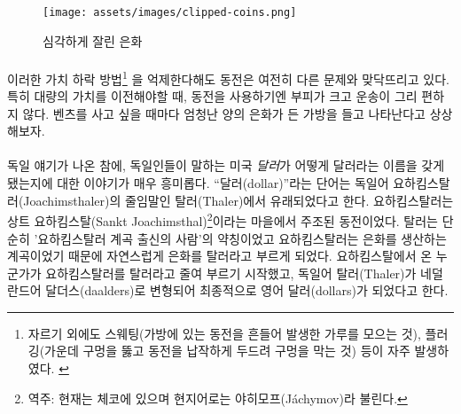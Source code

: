 \begin{figure}
	\texttt{[image: assets/images/clipped-coins.png]}
	\caption{심각하게 잘린 은화}
	\label{fig:clipped-coins}
\end{figure}

\paragraph{}
\begin{comment}
	Even with these methods of coin debasement\footnote{Besides clipping, sweating
		(shaking the coins in a bag and collecting the dust worn off) and plugging
		(punching a hole in the middle and hammering the coin flat to close the hole)
		were the most prominent methods of coin debasement. \cite{wiki:coin-debasement}}
	kept in check, coins still suffer from other issues. They are bulky and not very
	convenient to transport, especially when large transfers of value need to
	happen. Showing up with a huge bag of silver dollars every time you want to buy
	a Mercedes isn't very practical.
\end{comment}
이러한 가치 하락 방법\footnote{자르기 외에도 스웨팅(가방에 있는 동전을 흔들어 발생한 가루를 모으는 것),
	플러깅(가운데 구멍을 뚫고 동전을 납작하게 두드려 구멍을 막는 것) 등이 자주 발생하였다.
	\cite{wiki:coin-debasement}}
을 억제한다해도 동전은 여전히 다른 문제와 맞닥뜨리고 있다. 
특히 대량의 가치를 이전해야할 때, 동전을 사용하기엔 부피가 크고 운송이 그리 편하지 않다.
벤츠를 사고 싶을 때마다 엄청난 양의 은화가 든 가방을 들고 나타난다고 상상해보자.

\paragraph{}
\begin{comment}
	Speaking of German things: How the United States \textit{dollar} got its name is
	another interesting story. The word \enquote{dollar} is derived from the German word
	\textit{Thaler}, short for a \textit{Joachimsthaler}~\cite{wiki:thaler}. A
	Joachimsthaler was a coin minted in the town of \textit{Sankt Joachimsthal}.
	Thaler is simply a shorthand for someone (or something) coming from the valley,
	and because Joachimsthal was \textit{the} valley for silver coin production,
	people simply referred to these silver coins as \textit{Thaler.} Thaler (German)
	morphed into daalders (Dutch), and finally dollars (English).
\end{comment}
독일 얘기가 나온 참에, 독일인들이 말하는 미국 \textit{달러}가 어떻게 달러라는 이름을 갖게 됐는지에 대한 이야기가 매우 흥미롭다.
\enquote{달러(dollar)}라는 단어는 독일어 요하킴스탈러(Joachimsthaler)의 줄임말인 탈러(Thaler)에서 유래되었다고 한다\cite{wiki:thaler}. 
요하킴스탈러는 상트 요하킴스탈(Sankt Joachimsthal)\footnote{역주: 현재는 체코에 있으며 현지어로는 야히모프(Jáchymov)라 불린다.}이라는 마을에서 주조된 동전이었다.
탈러는 단순히 '요하킴스탈러 계곡 출신의 사람'의 약칭이었고 요하킴스탈러는 은화를 생산하는 계곡이었기 때문에 자연스럽게 은화를 탈러라고 부르게 되었다. 
요하킴스탈에서 온 누군가가 요하킴스탈러를 탈러라고 줄여 부르기 시작했고, 
독일어 탈러(Thaler)가 네덜란드어 달더스(daalders)로 변형되어 최종적으로 영어 달러(dollars)가 되었다고 한다.

